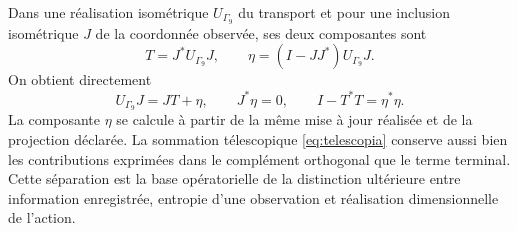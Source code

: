 Dans une réalisation isométrique \(U_{\Gamma_9}\) du transport et pour une inclusion isométrique \(J\) de la coordonnée observée, ses deux composantes sont
\[
 T=J^*U_{\Gamma_9}J,\qquad
 \eta=(I-JJ^*)U_{\Gamma_9}J.
\]
On obtient directement
\[
 U_{\Gamma_9}J=JT+\eta,\qquad J^*\eta=0,\qquad
 I-T^*T=\eta^*\eta.
\]
La composante \(\eta\) se calcule à partir de la même mise à jour réalisée et de la projection déclarée. La sommation télescopique \eqref{eq:telescopia} conserve aussi bien les contributions exprimées dans le complément orthogonal que le terme terminal. Cette séparation est la base opératorielle de la distinction ultérieure entre information enregistrée, entropie d'une observation et réalisation dimensionnelle de l'action.
